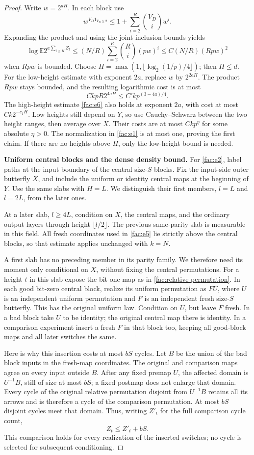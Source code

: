 \begin{proof}
Write $w=2^{aH}$. In each block use
\[
w^{V_D 1_{V_D\ge 2}}\le 1+\sum_{i=2}^{R}{V_D\choose i} w^i.
\]
Expanding the product and using the joint inclusion bounds yields
\[
\log\mathbb E 2^{a\sum_{t\le H} Z_t}
\le (N/R)\sum_{i=2}^{R}{R\choose i}(p w)^i
\le C(N/R)(R p w)^2
\]
when $Rpw$ is bounded. Choose
$H=\max(1,\lfloor\log_2(1/p)/4\rfloor)$; then $H\le d$.
For the low-height estimate with exponent $2a$, replace $w$ by
$2^{2aH}$. The product $Rp w$ stays bounded, and the resulting logarithmic
cost is at most
\[
 Ck p R2^{4aH}\le C'k p^{(3-4a)/4}.
\]
The high-height estimate \eqref{fac:e6} also holds at exponent $2a$,
with cost at most $Ck2^{-c_1H}$. Low heights still depend on $Y$, so use
Cauchy--Schwarz between the two height ranges, then average over $X$.
Their costs are at most $Ck p^\eta$ for some absolute $\eta>0$.
The normalization in \eqref{fac:e1} is at most one, proving the first
claim. If there are no heights above $H$, only the low-height bound is
needed.

\medskip\noindent\textbf{Uniform central blocks and the dense density bound.}\enspace
For \eqref{fac:e2}, label paths at the input boundary of the central
size-$S$ blocks. Fix the input-side outer butterfly $X$, and include the
uniform or identity central maps at the beginning of $Y$. Use the same
slabs with $H=L$. We distinguish their first members, $l=L$ and $l=2L$,
from the later ones.

At a later slab, $l\ge4L$, condition on $X$, the central maps, and the
ordinary output layers through height $\lfloor l/2\rfloor$. The previous
same-parity slab is measurable in this field. All fresh coordinates used
in \eqref{fac:e5} lie strictly above the central blocks, so that estimate
applies unchanged with $k=N$.

A first slab has no preceding member in its parity family. We therefore
need its moment only conditional on $X$, without fixing the central
permutations. For a height $t$ in this slab expose the bit-one map as in
\eqref{fac:relative-permutation}. In each good bit-zero central block,
realize its uniform permutation as $F U$, where $U$ is an independent
uniform permutation and $F$ is an independent fresh size-$S$ butterfly.
This has the original uniform law. Condition on $U$, but leave $F$ fresh.
In a bad block take $U$ to be identity; the original central map there
is identity. In a comparison experiment insert a fresh $F$ in that block
too, keeping all good-block maps and all later switches the same.

Here is why this insertion costs at most $bS$ cycles. Let $B$ be the
union of the bad block inputs in the fresh-map coordinates. The original
and comparison maps agree on every input outside $B$. After any fixed
premap $U$, the affected domain is $U^{-1}B$, still of size at most $bS$;
a fixed postmap does not enlarge that domain. Every cycle of the
original relative permutation disjoint from $U^{-1}B$ retains all its
arrows and is therefore a cycle of the comparison permutation. At most
$bS$ disjoint cycles meet that domain. Thus, writing $Z'_t$ for the full
comparison cycle count,
\[
 Z_t\le Z'_t+bS.
\]
This comparison holds for every realization of the inserted switches;
no cycle is selected for subsequent conditioning.


\end{proof}
